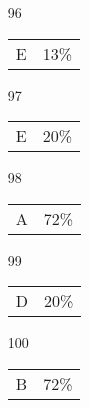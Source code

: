 \documentclass[12pt]{article}
\begin{document}
\begin{multicols}{5}
\begin{enumerate}
\item[]
\item[96] \begin{tabular}{cc} E & 13\%\end{tabular}
\item[97] \begin{tabular}{cc} E & 20\%\end{tabular}
\item[98] \begin{tabular}{cc} A & 72\%\end{tabular}
\item[99] \begin{tabular}{cc} D & 20\%\end{tabular}
\item[100] \begin{tabular}{cc} B & 72\%\end{tabular}

\item[]
\end{enumerate}
\end{multicols}
\clearpage
\end{document}
